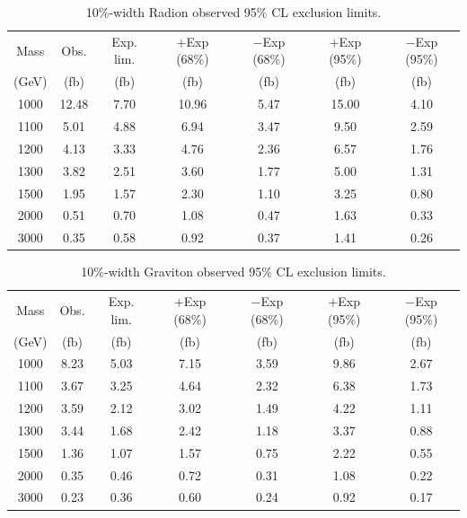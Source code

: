 \begin{table}[h]
	\begin{center}
	\caption{10\%-width Radion observed 95\% CL exclusion limits. }
	\label{tab:ExpLimRadWide}
	\begin{tabular}{c c c c c c c } 
	 \hline
	   Mass& Obs. & Exp. lim.& $+$Exp (68\%)& $-$Exp (68\%)& $+$Exp (95\%)& $-$Exp (95\%)\\
	   (GeV) & (fb) & (fb) & (fb) & (fb)& (fb)& (fb) \\
	\hline
	 1000 & 12.48 & 7.70 & 10.96 & 5.47 & 15.00 & 4.10 \\
	 1100 & 5.01 & 4.88 & 6.94 & 3.47 & 9.50 & 2.59 \\
	 1200 & 4.13 & 3.33 & 4.76 & 2.36 & 6.57 & 1.76 \\
	 1300 & 3.82 & 2.51 & 3.60 & 1.77 & 5.00 & 1.31 \\
	 1500 & 1.95 & 1.57 & 2.30 & 1.10 & 3.25 & 0.80 \\
	 2000 & 0.51 & 0.70 & 1.08 & 0.47 & 1.63 & 0.33 \\
	 3000 & 0.35 & 0.58 & 0.92 & 0.37 & 1.41 & 0.26 \\ 
	 \hline
	\end{tabular}
	\end{center}
\end{table}
	
\begin{table}[h]
	\begin{center}
	\caption{10\%-width Graviton observed 95\% CL exclusion limits. }
	\label{tab:ExpLimBGWide}
	\begin{tabular}{c c c c c c c } 
	 \hline
	 Mass& Obs. & Exp. lim.& $+$Exp (68\%)& $-$Exp (68\%)& $+$Exp (95\%)& $-$Exp (95\%)\\
	 (GeV) & (fb) & (fb) & (fb) & (fb)& (fb)& (fb) \\
	\hline
	 1000 & 8.23 & 5.03 & 7.15 & 3.59 & 9.86 & 2.67 \\
	 1100 & 3.67 & 3.25 & 4.64 & 2.32 & 6.38 & 1.73 \\
	 1200 & 3.59 & 2.12 & 3.02 & 1.49 & 4.22 & 1.11 \\
	 1300 & 3.44 & 1.68 & 2.42 & 1.18 & 3.37 & 0.88 \\
	 1500 & 1.36 & 1.07 & 1.57 & 0.75 & 2.22 & 0.55 \\
	 2000 & 0.35 & 0.46 & 0.72 & 0.31 & 1.08 & 0.22 \\
	 3000 & 0.23 & 0.36 & 0.60 & 0.24 & 0.92 & 0.17 \\
	 \hline
	\end{tabular}
	\end{center}
\end{table}
